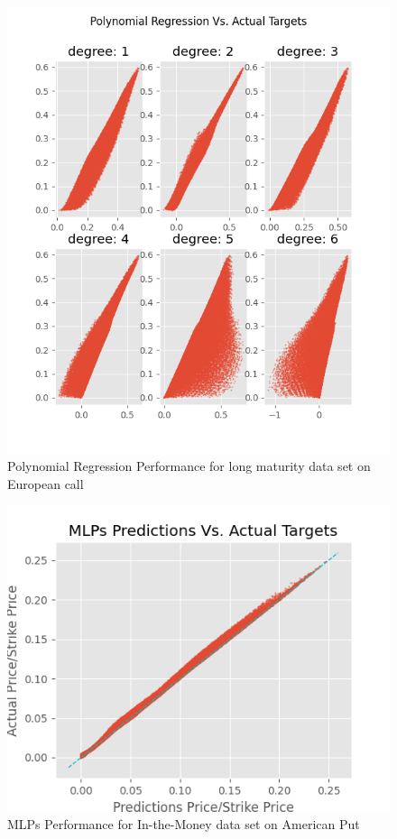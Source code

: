 \begin{figure}[th]
\centering
\includegraphics{Figures/polynomialLongTEuroC.png}
\decoRule
\caption[Polynomial Regression Performance for long maturity data set European call]{Polynomial Regression Performance for long maturity data set on European call}
\label{fig:MLPsEuroCLongMaturity}
\end{figure}


\begin{figure}[th]
\centering
\includegraphics{Figures/outMoneyAmerP.png}
\decoRule
\caption[MLPs Performance for In-the-Money data set on American Put]{MLPs Performance for In-the-Money data set on American Put}
\label{fig:MLPsAmerPOutMoney}
\end{figure}

